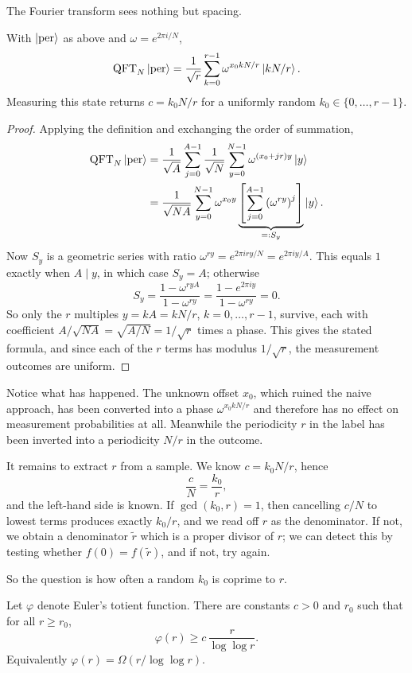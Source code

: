 \documentclass[a4paper]{scrartcl}
\newcommand{\QFT}{\operatorname{QFT}}
\begin{document}
The Fourier transform sees nothing but spacing.

\begin{theorem}
	With $\ket{\mathrm{per}}$ as above and $\omega = e^{2\pi i/N}$,
	$$\QFT_N\ket{\mathrm{per}} = \frac1{\sqrt r}\sum_{k=0}^{r-1}\omega^{x_0kN/r}\ket{kN/r}.$$
	Measuring this state returns $c = k_0N/r$ for a uniformly random $k_0\in\{0,\dots,r-1\}$.
\end{theorem}

\begin{proof}
	Applying the definition and exchanging the order of summation,
	\begin{align*}
		\QFT_N\ket{\mathrm{per}} &= \frac1{\sqrt A}\sum_{j=0}^{A-1}\frac{1}{\sqrt N}\sum_{y=0}^{N-1}\omega^{(x_0+jr)y}\ket y \\
		&= \frac1{\sqrt{NA}}\sum_{y=0}^{N-1}\omega^{x_0y}\underbrace{\left[\sum_{j=0}^{A-1}\left(\omega^{ry}\right)^j\right]}_{=:S_y}\ket y.
	\end{align*}
	Now $S_y$ is a geometric series with ratio $\omega^{ry} = e^{2\pi i ry/N} = e^{2\pi iy/A}$. This equals $1$ exactly when $A \mid y$, in which case $S_y = A$; otherwise
	$$S_y = \frac{1-\omega^{ryA}}{1-\omega^{ry}} = \frac{1 - e^{2\pi i y}}{1-\omega^{ry}} = 0.$$
	So only the $r$ multiples $y = kA = kN/r$, $k = 0,\dots,r-1$, survive, each with coefficient $A/\sqrt{NA} = \sqrt{A/N} = 1/\sqrt r$ times a phase. This gives the stated formula, and since each of the $r$ terms has modulus $1/\sqrt r$, the measurement outcomes are uniform.
\end{proof}

Notice what has happened. The unknown offset $x_0$, which ruined the naive approach, has been converted into a phase $\omega^{x_0kN/r}$ and therefore has no effect on measurement probabilities at all. Meanwhile the periodicity $r$ in the label has been inverted into a periodicity $N/r$ in the outcome.

It remains to extract $r$ from a sample. We know $c = k_0N/r$, hence
$$\frac{c}{N} = \frac{k_0}{r},$$
and the left-hand side is known. If $\gcd(k_0,r)=1$, then cancelling $c/N$ to lowest terms produces exactly $k_0/r$, and we read off $r$ as the denominator. If not, we obtain a denominator $\widetilde r$ which is a proper divisor of $r$; we can detect this by testing whether $f(0) = f(\widetilde r)$, and if not, try again.

So the question is how often a random $k_0$ is coprime to $r$.

\begin{theorem}
	Let $\varphi$ denote Euler's totient function. There are constants $c>0$ and $r_0$ such that for all $r\geq r_0$,
	$$\varphi(r)\geq c\,\frac{r}{\log\log r}.$$
	Equivalently $\varphi(r) = \Omega(r/\log\log r)$.
\end{theorem}
\end{document}
